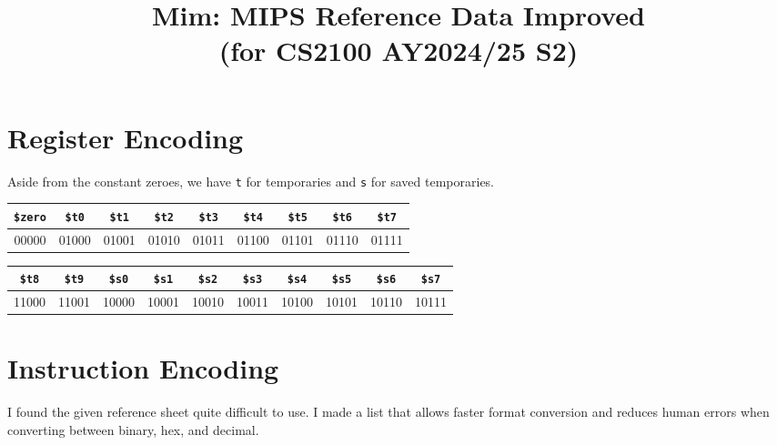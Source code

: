 \documentclass[a4paper, 10pt]{article}
\title{\vspace{-1em}\textbf{Mim: MIPS Reference Data Improved \\(for CS2100 AY2024/25 S2)}\vspace{-1em}}
\date{}
\begin{document}
\maketitle
{}

\section*{Register Encoding}

Aside from the constant zeroes, we have \texttt{t} for temporaries and \texttt{s} for saved temporaries.

\begin{table}[ht]
  \centering
  \small
  \begin{tabular}{*{9}{c}}
    \toprule
    \texttt{\$zero} & \texttt{\$t0} & \texttt{\$t1} & \texttt{\$t2} & \texttt{\$t3} & \texttt{\$t4} & \texttt{\$t5} & \texttt{\$t6} & \texttt{\$t7} \\ \midrule
    00000  & 01000 & 01001 & 01010 & 01011 & 01100 & 01101 & 01110 & 01111 \\ 
    \bottomrule
  \end{tabular}
  
  \vspace{2ex}
  
  \begin{tabular}{*{10}{c}}
    \toprule
    \texttt{\$t8} & \texttt{\$t9} & \texttt{\$s0} & \texttt{\$s1} & \texttt{\$s2} & \texttt{\$s3} & \texttt{\$s4} & \texttt{\$s5} & \texttt{\$s6} & \texttt{\$s7} \\ \midrule
    11000 & 11001 & 10000 & 10001 & 10010 & 10011 & 10100 & 10101 & 10110 & 10111 \\ 
    \bottomrule
  \end{tabular}
\end{table}

\section*{Instruction Encoding}

I found the given reference sheet quite difficult to use. I made a list that allows faster format conversion and reduces human errors when converting between binary, hex, and decimal.
\end{document}
